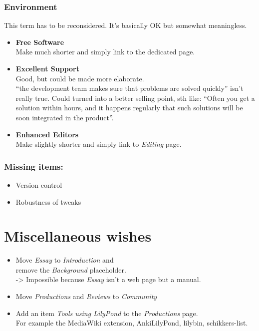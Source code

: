 \documentclass[10pt,a4paper,]{article}
\begin{document}
\subsubsection*{Environment}
This term has to be reconsidered.
It's basically OK but somewhat meaningless.

\begin{itemize}
\item \textbf{Free Software}\\
Make much shorter and simply link to the dedicated page.
\item \textbf{Excellent Support}\\
Good, but could be made more elaborate.\\
“the development team makes sure that problems are solved quickly” isn't really true.
Could turned into a better selling point, sth like: “Often you get a solution within hours, and it happens regularly that such solutions will be soon integrated in the product”.
\item \textbf{Enhanced Editors}\\
Make slightly shorter and simply link to \emph{Editing} page.
\end{itemize}

\subsubsection*{Missing items:}
\begin{itemize}
\item Version control
\item Robustness of tweaks
\end{itemize}



\section*{Miscellaneous wishes}
\begin{itemize}
\item Move \emph{Essay} to \emph{Introduction} and\\
remove the \emph{Background} placeholder.\\
-> Impossible because \emph{Essay} isn't a web page but a manual.
\item Move \emph{Productions} and \emph{Reviews} to \emph{Community}
\item Add an item \emph{Tools using LilyPond} to the \emph{Productions} page.\\
For example the MediaWiki extension, AnkiLilyPond, lilybin, schikkers-list.
\end{itemize}
\end{document}
